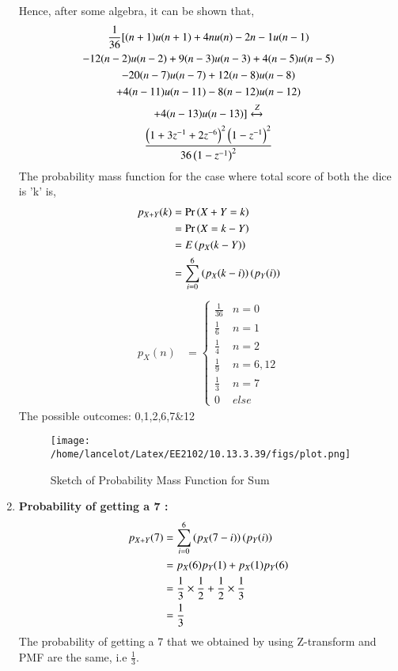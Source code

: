 \documentclass[journal,12pt,twocolumn]{IEEEtran}
\theoremstyle{remark}
\begin{document}
\begin{enumerate}
	Hence, after some algebra, it can be shown that,
	\begin{multline}
	\frac{1}{36}[{(n+1)u(n+1)+4{n}u(n)-2{n-1}u(n-1)}\\
	{-12(n-2)u(n-2)+9(n-3)u(n-3)+4(n-5)u(n-5)}\\
	{-20(n-7)u(n-7)+12(n-8)u(n-8)}\\
	{+4(n-11)u(n-11)-8(n-12)u(n-12)}\\
	{+4(n-13)u(n-13)}]
	\xleftrightarrow{Z}\\
	\frac{\left(1+3z^{-1}+2z^{-6}\right)^{2}\left(1-z^{-1}\right)^{2}}{36\left(1-z^{-1}\right)^{2}}
	\end{multline}
	The probability mass function for the case where total score of both the dice is 'k' is,
	\begin{align}
		p_{X+Y}(k) &= \Pr\left(X+Y=k\right)\\
			&= \Pr\left(X=k-Y\right)\\
			&= E\left(p_X(k-Y)\right)\\
			&= \sum_{i=0}^{6}\left(p_X(k-i)\right)\left(p_Y(i)\right)
	\end{align}
	\begin{align}
  p_X(n) &= 
  \begin{cases}
  \frac{1}{36} & n = 0
  \\
  \frac{1}{6} &  n = 1
  \\
  \frac{1}{4} &   n = 2
  \\
  \frac{1}{9} &   n = 6,12
  \\
  \frac{1}{3} &   n = 7
  \\
  0 &   else
  \end{cases}
  	\end{align}
	The possible outcomes: 0,1,2,6,7\&12
\begin{figure}[h!]
        \texttt{[image: /home/lancelot/Latex/EE2102/10.13.3.39/figs/plot.png]}
        \caption{Sketch of Probability Mass Function for Sum} 
\end{figure}
\item \textbf{Probability of getting a 7 :} 
	\begin{align}
		p_{X+Y}(7) &= \sum_{i=0}^{6}\left(p_X(7-i)\right)\left(p_Y(i)\right)\\
			&= p_X(6)p_Y(1) + p_X(1)p_Y(6)\\
			&= \frac{1}{3}\times\frac{1}{2} + \frac{1}{2}\times\frac{1}{3}\\
			&= \frac{1}{3}
	\end{align}
	The probability of getting a 7 that we obtained by using Z-transform and PMF are the same, i.e $\frac{1}{3}$.
\end{enumerate}
\end{document}
